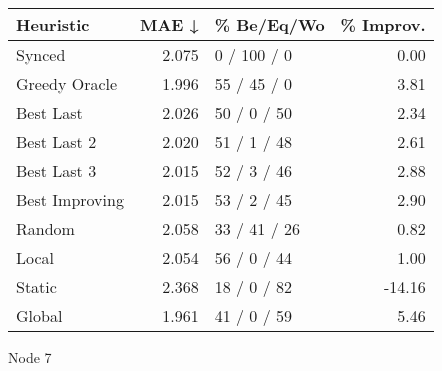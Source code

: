 \begin{tabular}{lrlr}
\toprule
\textbf{Heuristic} & \textbf{MAE ↓} & \textbf{\% Be/Eq/Wo} & \textbf{\% Improv.} \\
\midrule
            Synced &          2.075 &          0 / 100 / 0 &                0.00 \\
     Greedy Oracle &          1.996 &          55 / 45 / 0 &                3.81 \\
         Best Last &          2.026 &          50 / 0 / 50 &                2.34 \\
       Best Last 2 &          2.020 &          51 / 1 / 48 &                2.61 \\
       Best Last 3 &          2.015 &          52 / 3 / 46 &                2.88 \\
    Best Improving &          2.015 &          53 / 2 / 45 &                2.90 \\
            Random &          2.058 &         33 / 41 / 26 &                0.82 \\
             Local &          2.054 &          56 / 0 / 44 &                1.00 \\
            Static &          2.368 &          18 / 0 / 82 &              -14.16 \\
            Global &          1.961 &          41 / 0 / 59 &                5.46 \\
\bottomrule
\end{tabular}
\caption{Node 7}
\label{tab:ds_non_lr01_le2_bs4_7}
